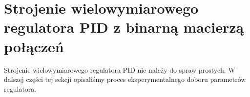 \section{Strojenie wielowymiarowego regulatora PID z binarną macierzą połączeń}
\label{pro_pid_bin_conn}

Strojenie wielowymiarowego regulatora PID nie należy do spraw prostych.
W dalszej części tej sekcji opisaliśmy proces eksperymentalnego 
doboru parametrów regulatora.


